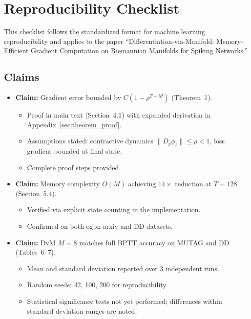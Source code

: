 
\section{Reproducibility Checklist}
\label{sec:checklist}

This checklist follows the standardized format for machine learning reproducibility and applies to the paper ``Differentiation-via-Manifold: Memory-Efficient Gradient Computation on Riemannian Manifolds for Spiking Networks.''

\subsection*{Claims}

\begin{itemize}
    \item \textbf{Claim:} Gradient error bounded by $C(1-\rho^{T-M})$ (Theorem~1).
    \begin{itemize}
        \item[\checkmark] Proof in main text (Section~4.1) with expanded derivation in Appendix~\ref{sec:theorem_proof}.
        \item[\checkmark] Assumptions stated: contractive dynamics $\|D_p\phi_t\|\le\rho<1$, loss gradient bounded at final state.
        \item[\checkmark] Complete proof steps provided.
    \end{itemize}
    \item \textbf{Claim:} Memory complexity $O(M)$ achieving $14\times$ reduction at $T{=}128$ (Section~5.4).
    \begin{itemize}
        \item[\checkmark] Verified via explicit state counting in the implementation.
        \item[\checkmark] Confirmed on both ogbn-arxiv and DD datasets.
    \end{itemize}
    \item \textbf{Claim:} DvM $M{=}8$ matches full BPTT accuracy on MUTAG and DD (Tables~6--7).
    \begin{itemize}
        \item[\checkmark] Mean and standard deviation reported over 3 independent runs.
        \item[\checkmark] Random seeds: 42, 100, 200 for reproducibility.
        \item[-] Statistical significance tests not yet performed; differences within standard deviation ranges are noted.
    \end{itemize}
\end{itemize}

